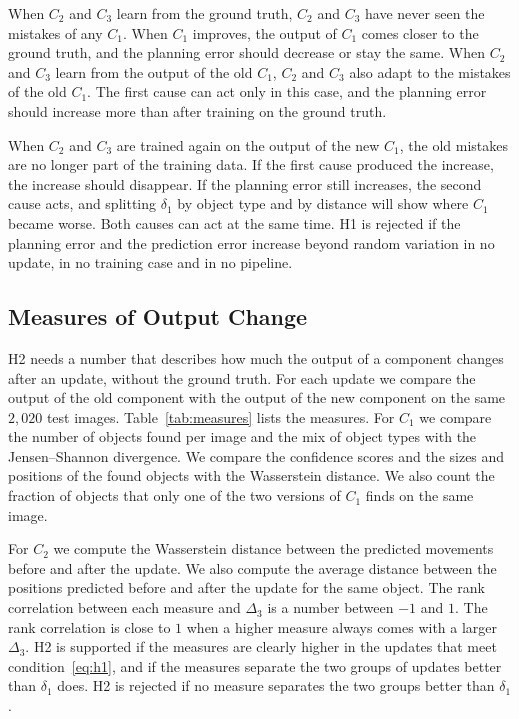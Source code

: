 \documentclass[11pt,a4paper]{article}
\begin{document}
When $C_2$ and $C_3$ learn from the ground truth, $C_2$ and $C_3$ have never
seen the mistakes of any $C_1$. When $C_1$ improves, the output of $C_1$
comes closer to the ground truth, and the planning error should decrease
or stay the same. When $C_2$ and $C_3$ learn from the output of the old
$C_1$, $C_2$ and $C_3$ also adapt to the mistakes of the old $C_1$. The
first cause can act only in this case, and the planning error should
increase more than after training on the ground truth.

When $C_2$ and $C_3$ are trained again on the output of the new $C_1$, the
old mistakes are no longer part of the training data. If the first cause
produced the increase, the increase should disappear. If the planning
error still increases, the second cause acts, and splitting $\delta_1$ by
object type and by distance will show where $C_1$ became worse. Both causes
can act at the same time. H1 is rejected if the planning error and the
prediction error increase beyond random variation in no update, in no
training case and in no pipeline.

\subsection{Measures of Output Change}
\label{sec:symptom}

H2 needs a number that describes how much the output of a component
changes after an update, without the ground truth. For each update we
compare the output of the old component with the output of the new
component on the same $2{,}020$ test images. Table~\ref{tab:measures}
lists the measures. For $C_1$ we compare the
number of objects found per image and the mix of object types with the
Jensen--Shannon divergence. We compare the confidence scores and the sizes
and positions of the found objects with the Wasserstein distance. We also
count the fraction of objects that only one of the two versions of $C_1$
finds on the same image.

For $C_2$ we compute the Wasserstein distance between the predicted
movements before and after the update. We also compute the average
distance between the positions predicted before and after the update for
the same object. The rank correlation between each measure and $\Delta_3$
is a number between $-1$ and $1$. The rank correlation is close to $1$
when a higher measure always comes with a larger $\Delta_3$. H2 is
supported if the measures are clearly higher in the updates that meet
condition~\eqref{eq:h1}, and if the measures separate the two groups of
updates better than $\delta_1$ does. H2 is rejected if no measure
separates the two groups better than $\delta_1$.
\end{document}
